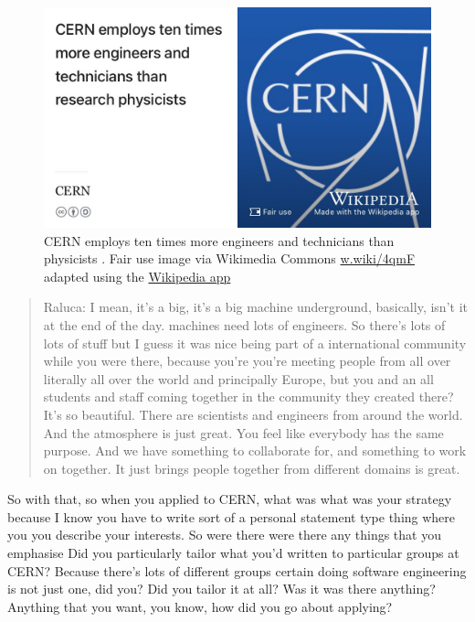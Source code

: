 \documentclass[
]{book}
\begin{document}
\begin{figure}

{\centering \includegraphics[width=1\linewidth]{images/cern-engineering} 

}

\caption{CERN employs ten times more engineers and technicians than physicists \citep{hullcern}. Fair use image via Wikimedia Commons \href{https://w.wiki/4qmF}{w.wiki/4qmF} adapted using the \href{https://apps.apple.com/}{Wikipedia app}}\label{fig:cern2-fig}
\end{figure}



\begin{quote}
Raluca: I mean, it's a big, it's a big machine underground, basically, isn't it at the end of the day. machines need lots of engineers. So there's lots of lots of stuff but I guess it was nice being part of a international community while you were there, because you're you're meeting people from all over literally all over the world and principally Europe, but you and an all students and staff coming together in the community they created there? It's so beautiful. There are scientists and engineers from around the world. And the atmosphere is just great. You feel like everybody has the same purpose. And we have something to collaborate for, and something to work on together. It just brings people together from different domains is great.
\end{quote}

So with that, so when you applied to CERN, what was what was your strategy because I know you have to write sort of a personal statement type thing where you you describe your interests. So were there were there any things that you emphasise Did you particularly tailor what you'd written to particular groups at CERN? Because there's lots of different groups certain doing software engineering is not just one, did you? Did you tailor it at all? Was it was there anything? Anything that you want, you know, how did you go about applying?
\end{document}
